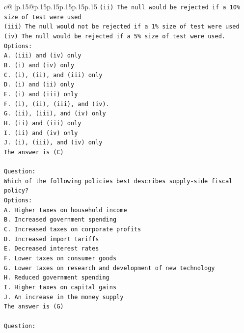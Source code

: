 \documentclass{article}
\begin{document}
{\begin{supertabular}{c@{$\;$}|p{.15\linewidth}@{}p{.15\linewidth}p{.15\linewidth}p{.15\linewidth}p{.15\linewidth}p{.15\linewidth}}
{{{\texttt{(ii) The null would be rejected if a 10\% size of test were used} \\
\texttt{(iii) The null would not be rejected if a 1\% size of test were used} \\
\texttt{(iv) The null would be rejected if a 5\% size of test were used.} \\
\texttt{Options:} \\
\texttt{A. (iii) and (iv) only} \\
\texttt{B. (i) and (iv) only} \\
\texttt{C. (i), (ii), and (iii) only} \\
\texttt{D. (i) and (ii) only} \\
\texttt{E. (i) and (iii) only} \\
\texttt{F. (i), (ii), (iii), and (iv).} \\
\texttt{G. (ii), (iii), and (iv) only} \\
\texttt{H. (ii) and (iii) only} \\
\texttt{I. (ii) and (iv) only} \\
\texttt{J. (i), (iii), and (iv) only} \\
\texttt{The answer is (C)} \\
\\ 
\texttt{Question:} \\
\texttt{Which of the following policies best describes supply{-}side fiscal policy?} \\
\texttt{Options:} \\
\texttt{A. Higher taxes on household income} \\
\texttt{B. Increased government spending} \\
\texttt{C. Increased taxes on corporate profits} \\
\texttt{D. Increased import tariffs} \\
\texttt{E. Decreased interest rates} \\
\texttt{F. Lower taxes on consumer goods} \\
\texttt{G. Lower taxes on research and development of new technology} \\
\texttt{H. Reduced government spending} \\
\texttt{I. Higher taxes on capital gains} \\
\texttt{J. An increase in the money supply} \\
\texttt{The answer is (G)} \\
\\ 
\texttt{Question:} \\
}}}
\end{supertabular}}
\end{document}
